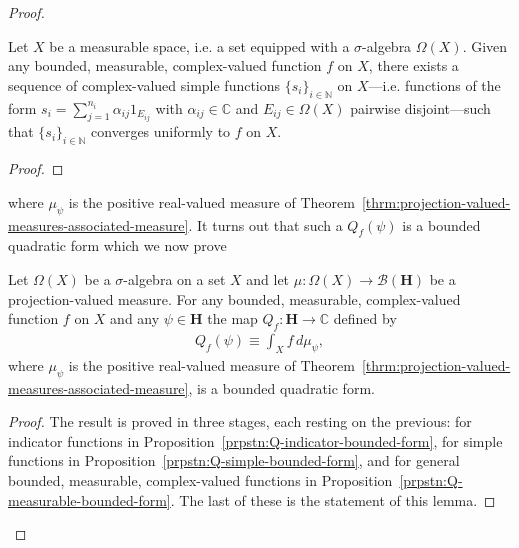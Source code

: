 \begin{proof}
\begin{theorem}
    \label{thrm:complex-valued-simple-approximation-theorem}
    \leanok
    Let $X$ be a measurable space, i.e. a set equipped with a $\sigma$-algebra $\Omega(X)$. Given any bounded, measurable, complex-valued function $f$ on $X$, there exists a sequence of complex-valued simple functions $\{s_i\}_{i \in \mathbb{N}}$ on $X$---i.e. functions of the form $s_i = \sum_{j = 1}^{n_i} \alpha_{ij} 1_{E_{ij}}$ with $\alpha_{ij} \in \mathbb{C}$ and $E_{ij} \in \Omega(X)$ pairwise disjoint---such that $\{s_i\}_{i \in \mathbb{N}}$ converges uniformly to $f$ on $X$.
\end{theorem}
\begin{proof}
\leanok
\end{proof}

where $\mu_\psi$ is the positive real-valued measure of Theorem~\ref{thrm:projection-valued-measures-associated-measure}. It turns out that such a $Q_f(\psi)$ is a bounded quadratic form which we now prove

\begin{lemma}
    \label{lmm:lemma1-of-operator-valued-integration}
    \leanok
    Let $\Omega(X)$ be a $\sigma$-algebra on a set $X$ and let $\mu : \Omega(X) \rightarrow \mathcal{B}(\mathbf{H})$ be a projection-valued measure. For any bounded, measurable, complex-valued function $f$ on $X$ and any $\psi \in \mathbf{H}$ the map $Q_f : \mathbf{H} \rightarrow \mathbb{C}$ defined by
    \begin{align}
        Q_f(\psi) \equiv \int_X f \, d\mu_\psi,
    \end{align}
    where $\mu_\psi$ is the positive real-valued measure of Theorem~\ref{thrm:projection-valued-measures-associated-measure}, is a bounded quadratic form.
\end{lemma}
\begin{proof}
    \leanok
The result is proved in three stages, each resting on the previous: for indicator functions in Proposition~\ref{prpstn:Q-indicator-bounded-form}, for simple functions in Proposition~\ref{prpstn:Q-simple-bounded-form}, and for general bounded, measurable, complex-valued functions in Proposition~\ref{prpstn:Q-measurable-bounded-form}. The last of these is the statement of this lemma.
\end{proof}


\end{proof}
